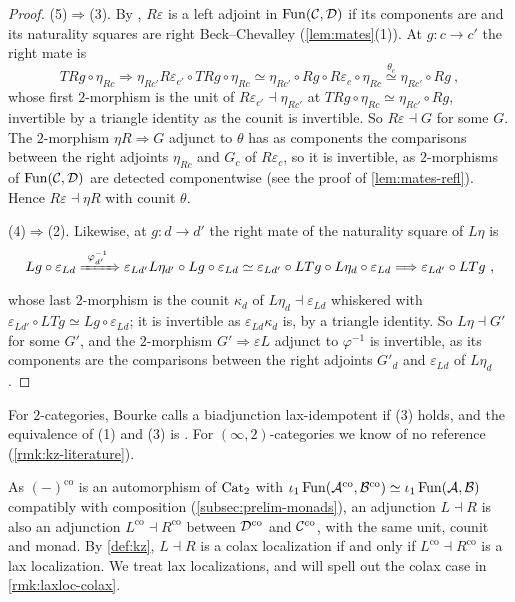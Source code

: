 \begin{proof}
(5)$\Rightarrow$(3). By
\cite[Cor.~5.2.12]{abellangagnahaugseng2024straightening},
$R\varepsilon$ is a left adjoint in $\operatorname{Fun}(\mathcal{C},\mathcal{D})$ if its components are and
its naturality squares are right Beck--Chevalley (\cref{lem:mates}(1)).
At $g\colon c \to c'$ the right mate is
\begin{equation*}
TRg \circ \eta_{Rc} \Longrightarrow \eta_{Rc'}R\varepsilon_{c'} \circ TRg \circ
\eta_{Rc} \simeq \eta_{Rc'} \circ Rg \circ R\varepsilon_{c} \circ \eta_{Rc}
\overset{\theta_{c}}{\simeq} \eta_{Rc'} \circ Rg \ ,
\end{equation*}
whose first $2$-morphism is the unit of
$R\varepsilon_{c'} \dashv \eta_{Rc'}$
at
$TRg \circ \eta_{Rc} \simeq \eta_{Rc'} \circ Rg$,
invertible by a triangle identity as the counit is invertible. So
$R\varepsilon \dashv G$
for some $G$. The $2$-morphism
$\eta R \Rightarrow G$
adjunct to $\theta$ has as components the comparisons between the right adjoints
$\eta_{Rc}$ and $G_{c}$ of $R\varepsilon_{c}$, so it is invertible, as
$2$-morphisms of $\operatorname{Fun}(\mathcal{C},\mathcal{D})$ are detected componentwise (see the proof of
\cref{lem:mates-refl}). Hence
$R\varepsilon \dashv \eta R$
with counit $\theta$.

(4)$\Rightarrow$(2). Likewise, at $g\colon d \to d'$ the right mate of the
naturality square of $L\eta$ is
\begin{equation*}
Lg \circ \varepsilon_{Ld} \xRightarrow{\ \varphi_{d'}^{-1}\ }
\varepsilon_{Ld'}L\eta_{d'} \circ Lg \circ \varepsilon_{Ld} \simeq
\varepsilon_{Ld'} \circ LTg \circ L\eta_{d} \circ \varepsilon_{Ld}
\Longrightarrow \varepsilon_{Ld'} \circ LTg \ ,
\end{equation*}
whose last $2$-morphism is the counit $\kappa_{d}$ of
$L\eta_{d} \dashv \varepsilon_{Ld}$
whiskered with
$\varepsilon_{Ld'} \circ LTg \simeq Lg \circ \varepsilon_{Ld}$;
it is invertible as
$\varepsilon_{Ld}\kappa_{d}$
is, by a triangle identity.
So $L\eta \dashv G'$ for some $G'$, and the $2$-morphism
$G' \Rightarrow \varepsilon L$
adjunct to $\varphi^{-1}$ is invertible, as its components are the comparisons
between the right adjoints $G'_{d}$ and $\varepsilon_{Ld}$ of $L\eta_{d}$.
\end{proof}

\begin{rmk}
\label{rmk:laxloc-literature}
%
For $2$-categories, Bourke \cite[\S 2.1]{bourke2025recognition} calls a
biadjunction lax-idempotent if (3) holds, and the equivalence of (1) and (3) is
\cite[Prop.~2.5.12]{stepan2025thesis}. For $(\infty,2)$-categories we know of no
reference (\cref{rmk:kz-literature}).
\end{rmk}

%
As $(-)^{\mathrm{co}}$ is an automorphism of $\mathrm{Cat}_{2}$ with
$\iota_{1}\operatorname{Fun}(\mathcal{A}^{\mathrm{co}},\mathcal{B}^{\mathrm{co}}) \simeq
\iota_{1}\operatorname{Fun}(\mathcal{A},\mathcal{B})$
compatibly with composition (\cref{subsec:prelim-monads}), an adjunction
$L \dashv R$ is also an adjunction
$L^{\mathrm{co}} \dashv R^{\mathrm{co}}$
between $\mathcal{D}^{\mathrm{co}}$ and $\mathcal{C}^{\mathrm{co}}$, with the same unit, counit
and monad. By \cref{def:kz}, $L \dashv R$ is a colax localization if
and only if
$L^{\mathrm{co}} \dashv R^{\mathrm{co}}$
is a lax localization. We treat lax localizations, and will spell out the colax
case in \cref{rmk:laxloc-colax}.

